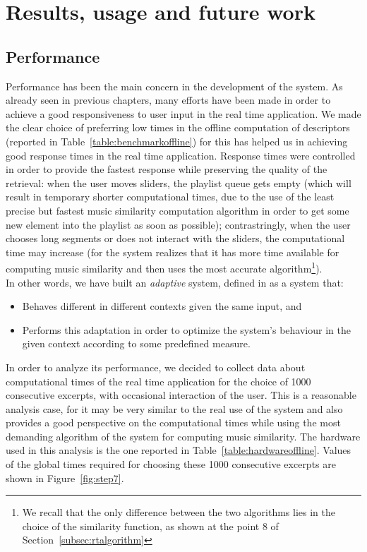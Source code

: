 \chapter{Results, usage and future work} 

\label{Chapter7} 


\section{Performance}
\label{sec:performanceanalysis}
Performance has been the main concern in the development of the system. As already seen in previous chapters, many efforts have been made in order to achieve a good responsiveness to user input in the real time application. We made the clear choice of preferring low times in the offline computation of descriptors (reported in Table~\ref{table:benchmarkoffline}) for this has helped us in achieving good response times in the real time application. Response times were controlled in order to provide the fastest response while preserving the quality of the retrieval: when the user moves sliders, the playlist queue gets empty (which will result in temporary shorter computational times, due to the use of the least precise but fastest music similarity computation algorithm in order to get some new element into the playlist as soon as possible); contrastringly, when the user chooses long segments or does not interact with the sliders, the computational time may increase (for the system realizes that it has more time available for computing music similarity and then uses the most accurate algorithm\footnote{We recall that the only difference between the two algorithms lies in the choice of the similarity function, as shown at the point 8 of Section~\ref{subsec:rtalgorithm}}). \\
In other words, we have built an \textit{adaptive} system, defined in \cite{stober11} as a system that:
\begin{itemize}
\item Behaves different in different contexts given the same input, and
\item Performs this adaptation in order to optimize the system's behaviour in the given context according to some predefined measure.
\end{itemize}
In order to analyze its performance, we decided to collect data about computational times of the real time application for the choice of 1000 consecutive excerpts, with occasional interaction of the user. This is a reasonable analysis case, for it may be very similar to the real use of the system and also provides a good perspective on the computational times while using the most demanding algorithm of the system for computing music similarity. The hardware used in this analysis is the one reported in Table~\ref{table:hardwareoffline}. Values of the global times required for choosing these 1000 consecutive excerpts are shown in Figure~\ref{fig:step7}. 


